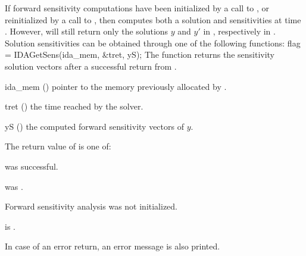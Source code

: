 If forward sensitivity computations have been initialized by a call to ,
or reinitialized by a call to , then {\idas} computes both a solution
and sensitivities at time . However,  will still return only the solutions
$y$ and $y'$ in , respectively in . Solution sensitivities can be obtained 
through one of the following functions:
{
  flag = IDAGetSens(ida\_mem, \&tret, yS);
}
{
  The function  returns the sensitivity solution vectors after a
  successful return from .
}
{
  \begin{args}
  \item[ida\_mem] ()
    pointer to the memory previously allocated by .
  \item[tret] ()
    the time reached by the solver.
  \item[yS] ()
    the computed forward sensitivity vectors of $y$.
  \end{args}
}
{
  The return value  of  is one of:
  \begin{args}
  \item[\Id{IDA\_SUCCESS}] 
     was successful.
  \item[\Id{IDA\_MEM\_NULL}] 
     was .
  \item[\Id{IDA\_NO\_SENS}] 
    Forward sensitivity analysis was not initialized.
  \item[\Id{IDA\_BAD\_DKY}] 
     is .
  \end{args}
}
{
  In case of an error return, an error message is also printed.  
}
